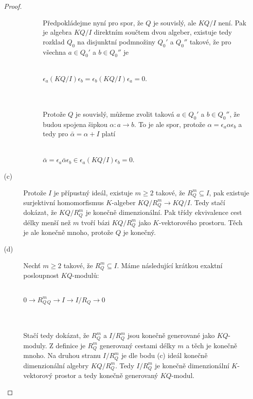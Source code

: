 \begin{proof}
\begin{description}
\begin{description}
            \item[\Leftarrow] Předpokládejme nyní pro spor, že $Q$ je souvislý, ale $KQ/I$ není. 
              Pak je algebra $KQ/I$ 
               direktním součtem dvou algeber, existuje tedy rozklad $Q_0$ na 
              disjunktní podmnožiny $Q_0'$ a $Q_0''$ takové, že pro všechna $a\in Q_0'$ 
              a $b\in Q_0''$ je \\\\
              \centerline{$\epsilon_a(KQ/I)\epsilon_b=\epsilon_b(KQ/I)\epsilon_a=0$.}\\\\  
              Protože $Q$ je souvislý, 
              můžeme zvolit taková $a\in Q_0'$  a $b\in Q_0''$, že budou spojena 
              šipkou $\alpha:a\to b$. 
              To je ale spor, protože $\alpha=\epsilon_a\alpha\epsilon_b$ a tedy pro $\bar\alpha=\alpha+I$ platí \\\\
              \centerline{$\bar\alpha=\epsilon_a\bar\alpha\epsilon_b\in 
              \epsilon_a(KQ/I)\epsilon_b=0$.}
          \end{description}
        
        \item[(c)] Protože $I$ je přípustný ideál, existuje $m\geq 2$ takové, že 
          $R_Q^m\subseteq I$, pak existuje surjektivní homomorfismus $K$-algeber 
          $KQ/R_Q^m\to KQ/I$. Tedy stačí dokázat, že $KQ/R_Q^m$ je konečně 
          dimenzionální. Pak třídy ekvivalence cest délky menší než $m$ tvoří 
          bázi $KQ/R_Q^m$ jako $K$-vektorového prostoru. Těch je ale konečně 
          mnoho, protože $Q$ je konečný.
          
        \item[(d)] Nechť $m\geq 2$ takové, že $R_Q^m\subseteq I$. Máme 
          následující krátkou exaktní posloupnost $KQ$-modulů: \\\\
          \centerline{$0\longrightarrow R_Q^m_Q \longrightarrow I \longrightarrow I/R_Q \longrightarrow 
          0$}\\\\
          Stačí tedy dokázat, že $R_Q^m$ a $I/R_Q^m$ jsou konečně generované jako 
          $KQ$-moduly. Z definice je $R_Q^m$ generovaný cestami délky $m$ a těch 
          je konečně mnoho. Na druhou stranu $I/R_Q^m$ je dle bodu (c) ideál konečně 
          dimenzionální algebry $KQ/R_Q^m$.  Tedy $I/R_Q^m$ je konečně dimenzionální 
          $K$-vektorový prostor a tedy konečně generovaný $KQ$-modul.
        

\end{description}
\end{proof}
